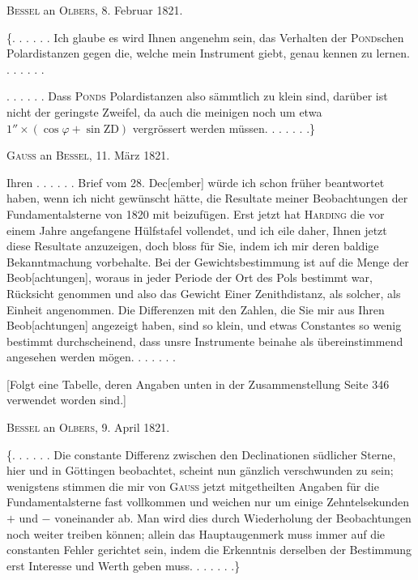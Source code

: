 \clearpage\begingroup
{}
\begin{center}\textsc{Bessel} an \textsc{Olbers}, 8. Februar 1821.\end{center}
\noindent\hspace*{\parindent}\{. . . . . . Ich glaube es wird Ihnen angenehm sein, das Verhalten der \textsc{Pond}schen Polardistanzen gegen die, welche mein Instrument giebt, genau kennen zu lernen. . . . . . .

. . . . . . Dass \textsc{Ponds} Polardistanzen also sämmtlich zu klein sind, darüber ist nicht der geringste Zweifel, da auch die meinigen noch um etwa \(1''\times(\cos\varphi+\sin\mathrm{ZD})\) vergrössert werden müssen. . . . . . .\}

\begin{center}\textsc{Gauss} an \textsc{Bessel}, 11. März 1821.\end{center}
\noindent\hspace*{\parindent}Ihren . . . . . . Brief vom 28. Dec[ember] würde ich schon früher beantwortet haben, wenn ich nicht gewünscht hätte, die Resultate meiner Beobachtungen der Fundamentalsterne von 1820 mit beizufügen. Erst jetzt hat \textsc{Harding} die vor einem Jahre angefangene Hülfstafel vollendet, und ich eile daher, Ihnen jetzt diese Resultate anzuzeigen, doch bloss für Sie, indem ich mir deren baldige Bekanntmachung vorbehalte. Bei der Gewichtsbestimmung ist auf die Menge der Beob[achtungen], woraus in jeder Periode der Ort des Pols bestimmt war, Rücksicht genommen und also das Gewicht Einer Zenithdistanz, als solcher, als Einheit angenommen. Die Differenzen mit den Zahlen, die Sie mir aus Ihren Beob[achtungen] angezeigt haben, sind so klein, und etwas Constantes so wenig bestimmt durchscheinend, dass unsre Instrumente beinahe als übereinstimmend angesehen werden mögen. . . . . . .

[Folgt eine Tabelle, deren Angaben unten in der Zusammenstellung Seite 346 verwendet worden sind.]

\begin{center}\textsc{Bessel} an \textsc{Olbers}, 9. April 1821.\end{center}
\noindent\hspace*{\parindent}\{. . . . . . Die constante Differenz zwischen den Declinationen südlicher Sterne, hier und in Göttingen beobachtet, scheint nun gänzlich verschwunden zu sein; wenigstens stimmen die mir von \textsc{Gauss} jetzt mitgetheilten Angaben für die Fundamentalsterne fast vollkommen und weichen nur um einige Zehntelsekunden \(+\) und \(-\) voneinander ab. Man wird dies durch Wiederholung der Beobachtungen noch weiter treiben können; allein das Hauptaugenmerk muss immer auf die constanten Fehler gerichtet sein, indem
\clearpage{}
\noindent die Erkenntnis derselben der Bestimmung erst Interesse und Werth geben muss. . . . . . .\}

